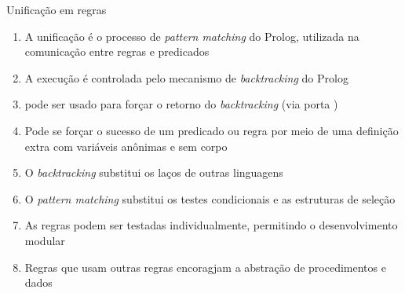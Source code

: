 \begin{frame}[fragile]{Unificação em regras}

    \begin{enumerate}
        \item A unificação é o processo de \textit{pattern matching} do Prolog, utilizada na 
            comunicação entre regras e predicados

        \item A execução é controlada pelo mecanismo de \textit{backtracking} do Prolog

        \item {} pode ser usado para forçar o retorno do 
            \textit{backtracking} (via porta )

        \item Pode se forçar o sucesso de um predicado ou regra por meio de uma definição 
            extra com variáveis anônimas e sem corpo

        \item O \textit{backtracking} substitui os laços de outras linguagens

        \item O \textit{pattern matching} substitui os testes condicionais e as estruturas de 
            seleção

        \item As regras podem ser testadas individualmente, permitindo o desenvolvimento 
            modular

        \item Regras que usam outras regras encoragjam a abstração de procedimentos e dados

    \end{enumerate}

\end{frame}
